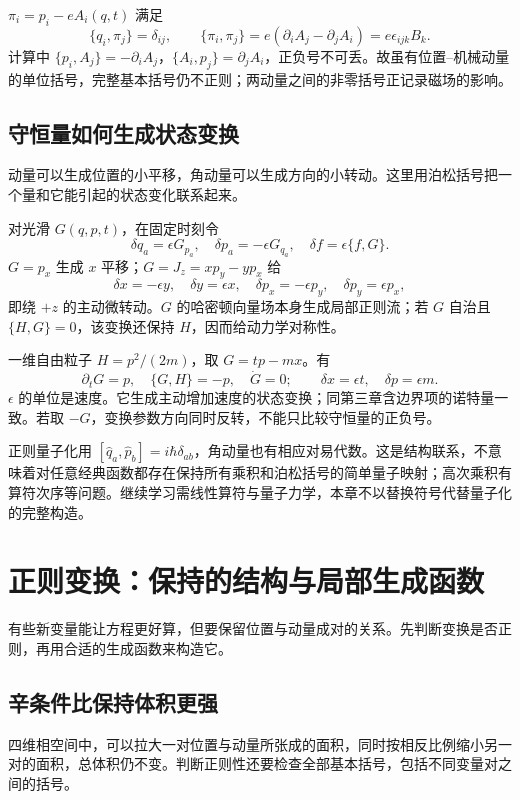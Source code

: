 \begin{example}[机械动量的磁括号]
$\pi_i=p_i-eA_i(q,t)$ 满足
\[
\{q_i,\pi_j\}=\delta_{ij},\qquad
\{\pi_i,\pi_j\}=e(\partial_iA_j-\partial_jA_i)=e\epsilon_{ijk}B_k.
\]
计算中 $\{p_i,A_j\}=-\partial_iA_j$，$\{A_i,p_j\}=\partial_jA_i$，正负号不可丢。故虽有位置--机械动量的单位括号，完整基本括号仍不正则；两动量之间的非零括号正记录磁场的影响。
\end{example}

\subsection{守恒量如何生成状态变换}
动量可以生成位置的小平移，角动量可以生成方向的小转动。这里用泊松括号把一个量和它能引起的状态变化联系起来。

对光滑 $G(q,p,t)$，在固定时刻令
\[
\delta q_a=\epsilon G_{p_a},\quad\delta p_a=-\epsilon G_{q_a},\quad
\delta f=\epsilon\{f,G\}.
\]
$G=p_x$ 生成 $x$ 平移；$G=J_z=xp_y-yp_x$ 给
\[
\delta x=-\epsilon y,\quad\delta y=\epsilon x,\quad
\delta p_x=-\epsilon p_y,\quad\delta p_y=\epsilon p_x,
\]
即绕 $+z$ 的主动微转动。$G$ 的哈密顿向量场本身生成局部正则流；若 $G$ 自治且 $\{H,G\}=0$，该变换还保持 $H$，因而给动力学对称性。

\begin{example}[伽利略速度变换与含时守恒量]
一维自由粒子 $H=p^2/(2m)$，取 $G=tp-mx$。有
\[
\partial_tG=p,\quad\{G,H\}=-p,\quad\dot G=0;
\qquad\delta x=\epsilon t,\quad\delta p=\epsilon m.
\]
$\epsilon$ 的单位是速度。它生成主动增加速度的状态变换；同第三章含边界项的诺特量一致。若取 $-G$，变换参数方向同时反转，不能只比较守恒量的正负号。
\end{example}

\begin{modernbox}[title={进一步探索：泊松括号与量子对易子的对应范围}]
正则量子化用 $[\hat q_a,\hat p_b]=i\hbar\delta_{ab}$，角动量也有相应对易代数。这是结构联系，不意味着对任意经典函数都存在保持所有乘积和泊松括号的简单量子映射；高次乘积有算符次序等问题。继续学习需线性算符与量子力学，本章不以替换符号代替量子化的完整构造。
\end{modernbox}


\section{正则变换：保持的结构与局部生成函数}
有些新变量能让方程更好算，但要保留位置与动量成对的关系。先判断变换是否正则，再用合适的生成函数来构造它。

\subsection{辛条件比保持体积更强}
四维相空间中，可以拉大一对位置与动量所张成的面积，同时按相反比例缩小另一对的面积，总体积仍不变。判断正则性还要检查全部基本括号，包括不同变量对之间的括号。

